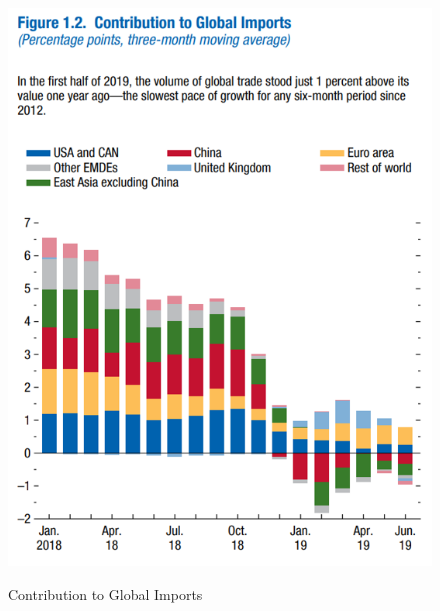 \begin{figure}[!ht]
\centering
\begin{minipage}[t]{.7\textwidth} %
\caption{Contribution to Global Imports} %
\includegraphics[width=1\textwidth]{img/globalimports.png}\\ %
\label{fig:weoexample2}
\end{minipage}
\end{figure}

